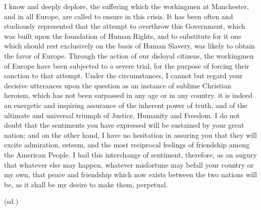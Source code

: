 \documentclass[12pt]{letter}
\begin{document}
\begin{letter}{}
I know and deeply deplore, the suffering which the workingmen at Manchester, and in all Europe, are called to ensure in this crisis. It has been often and studiously represented that the attempt to overthrow this Government, which was built upon the foundation of Human Rights, and to substitute for it one which should rest exclusively on the basis of Human Slavery, was likely to obtain the favor of Europe. Through the action of our disloyal citizens, the \marginpar{\textbf{[4]}} workingmen of Europe have been subjected to a severe trial, for the purpose of forcing their sanction to that attempt. Under the circumstances, I cannot but regard your decisive utterances upon the question as an instance of sublime Christian heroism, which has not been surpassed in any age or in any country. it is indeed an energetic and inspiring assurance of the inherent power of truth, and of the ultimate and universal triumph of Justice, Humanity and Freedom. I do not doubt that the sentiments you have expressed will be sustained by your great nation; and on the other hand, I have no hesitation in assuring you that they will excite admiration, esteem, and the most reciprocal feelings of friendship among the American People. I hail this interchange of sentiment, therefore, as an augury that whatever else may happen, whatever misfortune may befall your country or my own, that peace and friendship which now exists between the two nations will be, as it shall be my desire to make them, perpetual.

\signature{\vspace{-4em}Abraham Lincoln}
\closing{(sd.)}


\end{letter}
\end{document}
